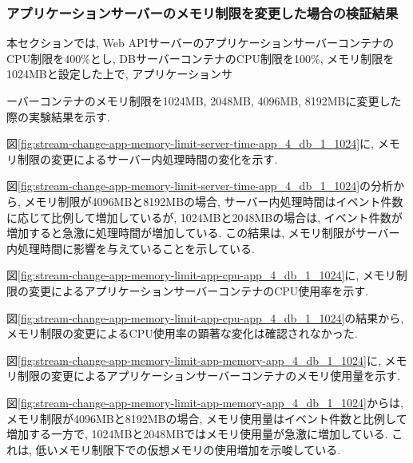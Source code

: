 \documentclass[../../../../main]{subfiles}
\begin{document}
    \subsubsection{アプリケーションサーバーのメモリ制限を変更した場合の検証結果}\label{subsubsec:result-streaming-change-app-memory}

    本セクションでは, Web APIサーバーのアプリケーションサーバーコンテナのCPU制限を400\%とし, DBサーバーコンテナのCPU制限を100\%, メモリ制限を1024MBと設定した上で, アプリケーションサ

    ーバーコンテナのメモリ制限を1024MB, 2048MB, 4096MB, 8192MBに変更した際の実験結果を示す.


    図\ref{fig:stream-change-app-memory-limit-server-time-app_4_db_1_1024}に, メモリ制限の変更によるサーバー内処理時間の変化を示す.

    

    図\ref{fig:stream-change-app-memory-limit-server-time-app_4_db_1_1024}の分析から, メモリ制限が4096MBと8192MBの場合, サーバー内処理時間はイベント件数に応じて比例して増加しているが, 1024MBと2048MBの場合は, イベント件数が増加すると急激に処理時間が増加している. この結果は, メモリ制限がサーバー内処理時間に影響を与えていることを示している.


    図\ref{fig:stream-change-app-memory-limit-app-cpu-app_4_db_1_1024}に, メモリ制限の変更によるアプリケーションサーバーコンテナのCPU使用率を示す.

    

    図\ref{fig:stream-change-app-memory-limit-app-cpu-app_4_db_1_1024}の結果から, メモリ制限の変更によるCPU使用率の顕著な変化は確認されなかった.


    図\ref{fig:stream-change-app-memory-limit-app-memory-app_4_db_1_1024}に, メモリ制限の変更によるアプリケーションサーバーコンテナのメモリ使用量を示す.

    

    図\ref{fig:stream-change-app-memory-limit-app-memory-app_4_db_1_1024}からは, メモリ制限が4096MBと8192MBの場合, メモリ使用量はイベント件数と比例して増加する一方で, 1024MBと2048MBではメモリ使用量が急激に増加している. これは, 低いメモリ制限下での仮想メモリの使用増加を示唆している.
\end{document}
